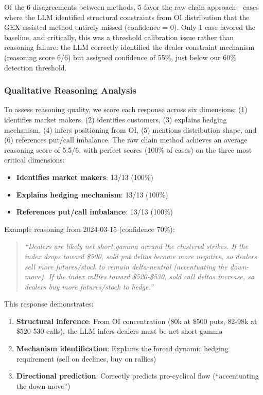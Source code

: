 Of the 6 disagreements between methods, 5 favor the raw chain approach—cases where the LLM identified structural constraints from OI distribution that the GEX-assisted method entirely missed (confidence = 0). Only 1 case favored the baseline, and critically, this was a threshold calibration issue rather than reasoning failure: the LLM correctly identified the dealer constraint mechanism (reasoning score 6/6) but assigned confidence of 55\%, just below our 60\% detection threshold.

\subsubsection{Qualitative Reasoning Analysis}

To assess reasoning quality, we score each response across six dimensions: (1) identifies market makers, (2) identifies customers, (3) explains hedging mechanism, (4) infers positioning from OI, (5) mentions distribution shape, and (6) references put/call imbalance. The raw chain method achieves an average reasoning score of 5.5/6, with perfect scores (100\% of cases) on the three most critical dimensions:

\begin{itemize}
    \item \textbf{Identifies market makers}: 13/13 (100\%)
    \item \textbf{Explains hedging mechanism}: 13/13 (100\%)
    \item \textbf{References put/call imbalance}: 13/13 (100\%)
\end{itemize}

Example reasoning from 2024-03-15 (confidence 70\%):

\begin{quote}
\textit{``Dealers are likely net short gamma around the clustered strikes. If the index drops toward \$500, sold put deltas become more negative, so dealers sell more futures/stock to remain delta-neutral (accentuating the down-move). If the index rallies toward \$520-\$530, sold call deltas increase, so dealers buy more futures/stock to hedge.''}
\end{quote}

This response demonstrates:
\begin{enumerate}
    \item \textbf{Structural inference}: From OI concentration (80k at \$500 puts, 82-98k at \$520-530 calls), the LLM infers dealers must be net short gamma
    \item \textbf{Mechanism identification}: Explains the forced dynamic hedging requirement (sell on declines, buy on rallies)
    \item \textbf{Directional prediction}: Correctly predicts pro-cyclical flow (``accentuating the down-move'')
\end{enumerate}

